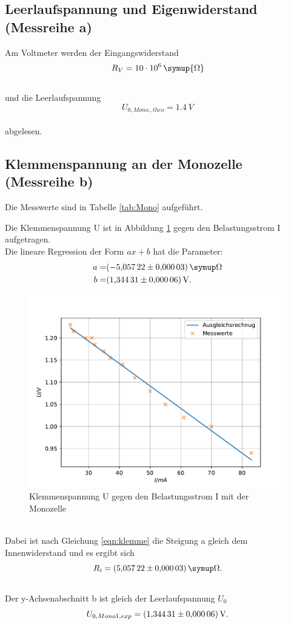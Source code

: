 \subsection{Leerlaufspannung und Eigenwiderstand (Messreihe a)}
Am Voltmeter werden der Eingangswiderstand
\begin{equation*}
  R_{V}=\SI{10e6}{\symup{\Omega}}
\end{equation*}
\\und die Leerlaufspannung
\begin{equation*}
  U_{0, Mono., theo}=\SI{1.4}{V}
\end{equation*}
\\abgelesen.

\subsection{Klemmenspannung an der Monozelle (Messreihe b)}
Die Messwerte sind in Tabelle \ref{tab:Mono} aufgeführt.

Die Klemmenspannung U ist in Abbildung \ref{fig:Mono} gegen den Belastungsstrom I aufgetragen.
\\Die lineare Regression der Form $ax+b$ hat die Parameter:
\begin{align*}
a=& \SI{-5.05722 \pm 0.00003}{\symup\Omega}\\
b=& \SI{1.34431 \pm 0.00006}{V}.\\
\end{align*}
\begin{figure}[h!]
  \centering
  \includegraphics[width=\textwidth]{Mono.pdf}
  \caption{Klemmenspannung U gegen den Belastungsstrom I mit der Monozelle}
  \label{fig:Mono}
\end{figure}
\\Dabei ist nach Gleichung \eqref{eqn:klemme} die Steigung a gleich dem Innenwiderstand und es ergibt sich
\begin{equation*}
  R_{i}=\SI{5.05722 \pm 0.00003}{\symup\Omega}.
\end{equation*}
\\Der y-Achsenabschnitt b ist gleich der Leerlaufspannung $U_{0}$
\begin{equation*}
  U_{0, Mono1, exp}=\SI{1.34431 \pm 0.00006}{V}.
\end{equation*}
\FloatBarrier

